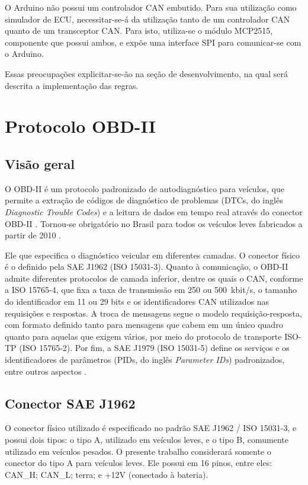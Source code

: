 O Arduino não possui um controlador CAN embutido. Para sua utilização como simulador de ECU, necessitar-se-á da utilização tanto de um controlador CAN quanto de um transceptor CAN. Para isto, utiliza-se o módulo MCP2515, componente que possui ambos, e expõe uma interface SPI para comunicar-se com o Arduino.

Essas preocupações explicitar-se-ão na seção de desenvolvimento, na qual será descrita a implementação das regras.

\section{Protocolo OBD-II} \label{sec:OBD}

\subsection{Visão geral}
O OBD-II é um protocolo padronizado de autodiagnóstico para veículos, que permite a extração de códigos de diagnóstico de problemas (DTCs, do inglês \textit{Diagnostic Trouble Codes}) e a leitura de dados em tempo real através do conector OBD-II \cite{csselectronics_obd2_intro}. Tornou-se obrigatório no Brasil para todos os veículos leves fabricados a partir de 2010 \cite{conama354_2004}.

Ele que especifica o diagnóstico veicular em diferentes camadas. O conector físico é o definido pela SAE J1962 (ISO 15031-3). Quanto à comunicação, o OBD-II admite diferentes protocolos de camada inferior, dentre os quais o CAN, conforme a ISO 15765-4, que fixa a taxa de transmissão em 250 ou 500~kbit/s, o tamanho do identificador em 11 ou 29 bits e os identificadores CAN utilizados nas requisições e respostas. A troca de mensagens segue o modelo requisição-resposta, com formato definido tanto para mensagens que cabem em um único quadro quanto para aquelas que exigem vários, por meio do protocolo de transporte ISO-TP (ISO 15765-2). Por fim, a SAE J1979 (ISO 15031-5) define os serviços e os identificadores de parâmetros (PIDs, do inglês \textit{Parameter IDs}) padronizados, entre outros aspectos \cite{csselectronics_obd2_intro}.

\subsection{Conector SAE J1962}
O conector físico utilizado é especificado no padrão SAE J1962 / ISO 15031-3, e possui dois tipos: o tipo A, utilizado em veículos leves, e o tipo B, comumente utilizado em veículos pesados. O presente trabalho considerará somente o conector do tipo A para veículos leves. Ele possui em 16 pinos, entre eles: CAN\_H; CAN\_L; terra; e +12V (conectado à bateria).


